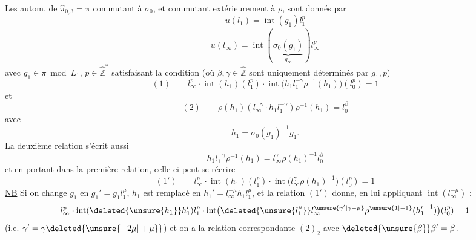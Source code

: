 Les autom.  de $\hat\pi_{0,3}=\pi$ commutant à $\sigma_0$, et commutant extérieurement à $\rho$, sont donnés par
\[
u(l_1)=\operatorname{int}(g_1)l_1^{p}
\]
\[
u(l_\infty)=\operatorname{int}(\underbrace{\sigma_0(g_1)}_{g_\infty})l_\infty^{p}
\]
avec $g_1\in\pi\bmod L_1$, $p\in\hat{\mathbb Z}^{*}$ satisfaisant la condition (où $\beta,\gamma\in\hat{\mathbb Z}$ sont uniquement déterminés par $g_1,p$)
\[
(1)\qquad\boxed{l_\infty^{p}\cdot\operatorname{int}(h_1)(l_1^{p})\cdot\operatorname{int}\bigl(h_1l_1^{-\gamma}\rho^{-1}(h_1)\bigr)(l_0^{p})=1}
\]
et
\[
(2)\qquad\boxed{\rho(h_1)(l_\infty^{-\gamma}\cdot h_1l_1^{-\gamma})\rho^{-1}(h_1)=l_0^\beta}
\]
avec
\[
h_1=\sigma_0(g_1)^{-1}g_1.
\]
La deuxième relation s'écrit aussi
\[
h_1l_1^{-\gamma}\rho^{-1}(h_1)=l_\infty^\gamma\rho(h_1)^{-1}l_0^\beta
\]
et en portant dans la première relation, celle-ci peut se récrire
\[
(1')\qquad\boxed{l_\infty^{p}\cdot\operatorname{int}(h_1)(l_1^{p})\cdot\operatorname{int}\bigl(l_\infty^\gamma\rho(h_1)^{-1}\bigr)(l_0^{p})=1}
\]
\uline{NB} Si on change $g_1$ en $g_1'=g_1l_1^\mu$, $h_1$ est remplacé en $h_1'=l_\infty^{-\mu}h_1l_1^\mu$, et la relation $(1')$ donne, en lui appliquant $\operatorname{int}(l_\infty^{-\mu})$ :
\[
l_\infty^{p}\cdot\operatorname{int}(\deleted{\unsure{h_1}}h_1')l_1^{p}\cdot\operatorname{int}\bigl(\deleted{\unsure{l_1^\mu}}l_\infty^{\unsure{\gamma'|\gamma-\mu}}\rho^{\unsure{1|-1}}({h_1'}^{-1})\bigr)(l_0^{p})=1
\]
(\uline{i.e.} \uline{$\gamma'=\gamma\deleted{\unsure{+2\mu|+\mu}}$}) et on a la relation correspondante $(2)_2$ avec $\deleted{\unsure{\beta}}\beta'=\beta$.
